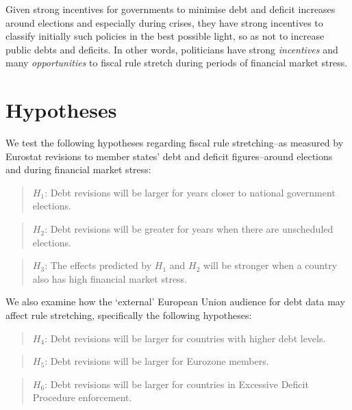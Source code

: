\documentclass[]{article}
\begin{document}
Given strong incentives for governments to minimise debt and deficit increases around elections and especially during crises, they have strong incentives to  classify initially such policies in the best possible light, so as not to increase public debts and deficits. In other words, politicians have strong \emph{incentives} and many \emph{opportunities} to fiscal rule stretch during periods of financial market stress.

\section{Hypotheses}

We test the following hypotheses regarding fiscal rule stretching--as measured by Eurostat revisions to member states' debt and deficit figures--around elections and during financial market stress:

\begin{quote}
    $H_{1}$: Debt revisions will be larger for years closer to national government elections.
\end{quote}

\begin{quote}
    $H_{2}$: Debt revisions will be greater for years when there are unscheduled elections.
\end{quote}

\begin{quote}
    $H_{3}$: The effects predicted by $H_{1}$ and $H_{2}$ will be stronger when a country also has high financial market stress.
\end{quote}

We also examine how the `external' European Union audience for debt data may affect rule stretching, specifically the following hypotheses:

\begin{quote}
    $H_{4}$: Debt revisions will be larger for countries with higher debt levels.
\end{quote}

\begin{quote}
    $H_{5}$: Debt revisions will be larger for Eurozone members.
\end{quote}

\begin{quote}
    $H_{6}$: Debt revisions will be larger for countries in Excessive Deficit Procedure enforcement.
\end{quote}

\end{document}
